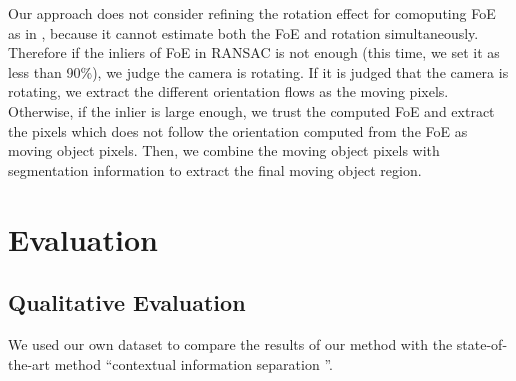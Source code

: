 \documentclass[10pt, twocolumn]{article}
\begin{document}
Our approach does not consider refining the rotation effect for comoputing FoE as in \cite{hu2000}, because it cannot estimate both the FoE and rotation simultaneously.
Therefore if the inliers of FoE in RANSAC is not enough (this time, we set it as less than 90\%), we judge the camera is rotating.
If it is judged that the camera is rotating, we extract the different orientation flows as the moving pixels.
Otherwise, if the inlier is large enough, we trust the computed FoE and extract the pixels which does not follow the orientation computed from the FoE as moving object pixels.
Then, we combine the moving object pixels with segmentation information to extract the final moving object region.


\section{Evaluation}

\subsection{Qualitative Evaluation}
We used our own dataset to compare the results of our method with the state-of-the-art method ``contextual information separation \cite{yang_loquercio_2019}''.
\end{document}
